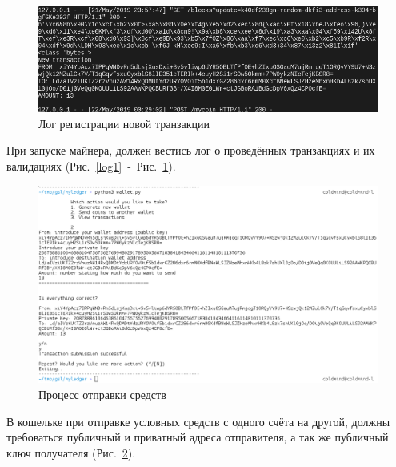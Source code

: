 \begin{figure}[h!]
    \centering
    \includegraphics[width=\textwidth]{./screenshots/log_send}
    \caption{Лог регистрации новой транзакции}\label{log2}
\end{figure}

При запуске майнера, должен вестись лог о проведённых транзакциях и их
валидациях (Рис.~\ref{log1}~-~Рис.~\ref{log2}).

\begin{figure}[h!]
    \centering
    \includegraphics[width=\textwidth]{./screenshots/sending}
    \caption{Процесс отправки средств}\label{sending}
\end{figure}

В кошельке при отправке условных средств с одного счёта на другой, должны
требоваться публичный и приватный адреса отправителя, а так же публичный ключ
получателя (Рис.~\ref{sending}).

